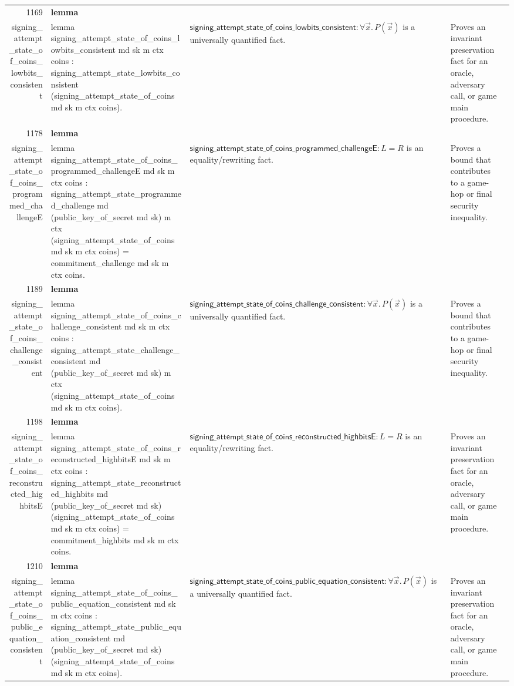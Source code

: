 \documentclass[10pt]{article}
\newcommand{\ec}[1]{\begingroup\ttfamily\scriptsize #1\endgroup}
\begin{document}
\begin{longtable}{r L{0.17\textwidth} L{0.26\textwidth} L{0.27\textwidth} L{0.20\textwidth}}
1169 & \textbf{lemma}\\\ec{signing\_attempt\_state\_of\_coins\_lowbits\_consistent} & \ec{lemma signing\_attempt\_state\_of\_coins\_lowbits\_consistent md sk m ctx coins : signing\_attempt\_state\_lowbits\_consistent (signing\_attempt\_state\_of\_coins md sk m ctx coins).} & \(\mathsf{signing\_attempt\_state\_of\_coins\_lowbits\_consistent} : \forall \vec{x}.\, P(\vec{x})\) is a universally quantified fact. & Proves an invariant preservation fact for an oracle, adversary call, or game main procedure. \\
1178 & \textbf{lemma}\\\ec{signing\_attempt\_state\_of\_coins\_programmed\_challengeE} & \ec{lemma signing\_attempt\_state\_of\_coins\_programmed\_challengeE md sk m ctx coins : signing\_attempt\_state\_programmed\_challenge md (public\_key\_of\_secret md sk) m ctx (signing\_attempt\_state\_of\_coins md sk m ctx coins) = commitment\_challenge md sk m ctx coins.} & \(\mathsf{signing\_attempt\_state\_of\_coins\_programmed\_challengeE} : L = R\) is an equality/rewriting fact. & Proves a bound that contributes to a game-hop or final security inequality. \\
1189 & \textbf{lemma}\\\ec{signing\_attempt\_state\_of\_coins\_challenge\_consistent} & \ec{lemma signing\_attempt\_state\_of\_coins\_challenge\_consistent md sk m ctx coins : signing\_attempt\_state\_challenge\_consistent md (public\_key\_of\_secret md sk) m ctx (signing\_attempt\_state\_of\_coins md sk m ctx coins).} & \(\mathsf{signing\_attempt\_state\_of\_coins\_challenge\_consistent} : \forall \vec{x}.\, P(\vec{x})\) is a universally quantified fact. & Proves a bound that contributes to a game-hop or final security inequality. \\
1198 & \textbf{lemma}\\\ec{signing\_attempt\_state\_of\_coins\_reconstructed\_highbitsE} & \ec{lemma signing\_attempt\_state\_of\_coins\_reconstructed\_highbitsE md sk m ctx coins : signing\_attempt\_state\_reconstructed\_highbits md (public\_key\_of\_secret md sk) (signing\_attempt\_state\_of\_coins md sk m ctx coins) = commitment\_highbits md sk m ctx coins.} & \(\mathsf{signing\_attempt\_state\_of\_coins\_reconstructed\_highbitsE} : L = R\) is an equality/rewriting fact. & Proves an invariant preservation fact for an oracle, adversary call, or game main procedure. \\
1210 & \textbf{lemma}\\\ec{signing\_attempt\_state\_of\_coins\_public\_equation\_consistent} & \ec{lemma signing\_attempt\_state\_of\_coins\_public\_equation\_consistent md sk m ctx coins : signing\_attempt\_state\_public\_equation\_consistent md (public\_key\_of\_secret md sk) (signing\_attempt\_state\_of\_coins md sk m ctx coins).} & \(\mathsf{signing\_attempt\_state\_of\_coins\_public\_equation\_consistent} : \forall \vec{x}.\, P(\vec{x})\) is a universally quantified fact. & Proves an invariant preservation fact for an oracle, adversary call, or game main procedure. \\

\end{longtable}
\end{document}
